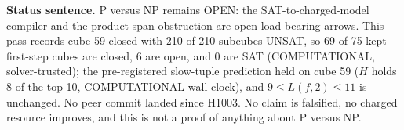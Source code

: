 \documentclass[11pt]{article}
\begin{document}
\bigskip
\noindent\textbf{Status sentence.} P versus NP remains OPEN: the SAT-to-charged-model compiler and the product-span obstruction are open load-bearing arrows. This pass records cube 59 closed with 210 of 210 subcubes UNSAT, so 69 of 75 kept first-step cubes are closed, 6 are open, and 0 are SAT (COMPUTATIONAL, solver-trusted); the pre-registered slow-tuple prediction held on cube 59 ($H$ holds 8 of the top-10, COMPUTATIONAL wall-clock), and $9\le L(f,2)\le 11$ is unchanged. No peer commit landed since H1003. No claim is falsified, no charged resource improves, and this is not a proof of anything about P versus NP.
\end{document}
